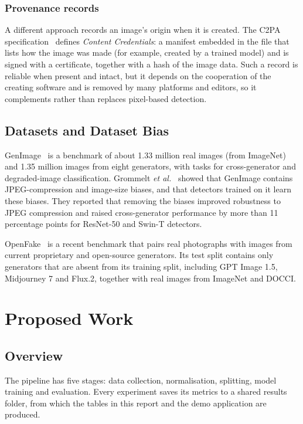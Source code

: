 \documentclass{mnnit}
\begin{document}
\subsection*{Provenance records}
A different approach records an image's origin when it is created. The
C2PA specification~\cite{c2pa2025spec} defines \emph{Content
Credentials}: a manifest embedded in the file that lists how the image
was made (for example, created by a trained model) and is signed with a
certificate, together with a hash of the image data. Such a record is
reliable when present and intact, but it depends on the cooperation of
the creating software and is removed by many platforms and editors, so
it complements rather than replaces pixel-based detection.

\section{Datasets and Dataset Bias}
GenImage~\cite{zhu2023genimage} is a benchmark of about 1.33 million
real images (from ImageNet) and 1.35 million images from eight
generators, with tasks for cross-generator and degraded-image
classification. Grommelt \emph{et al.}~\cite{grommelt2024fake} showed
that GenImage contains JPEG-compression and image-size biases, and that
detectors trained on it learn these biases. They reported that removing
the biases improved robustness to JPEG compression and raised
cross-generator performance by more than 11 percentage points for
\mbox{ResNet-50} and Swin-T detectors.

OpenFake~\cite{livernoche2025openfake} is a recent benchmark that pairs
real photographs with images from current proprietary and open-source
generators. Its test split contains only generators that are absent
from its training split, including GPT Image 1.5, Midjourney 7 and
Flux.2, together with real images from ImageNet and DOCCI.

\chapter{Proposed Work}

\section{Overview}
The pipeline has five stages: data collection, normalisation, splitting,
model training and evaluation. Every experiment saves its metrics to a
shared results folder, from which the tables in this report and the demo
application are produced.
\end{document}
